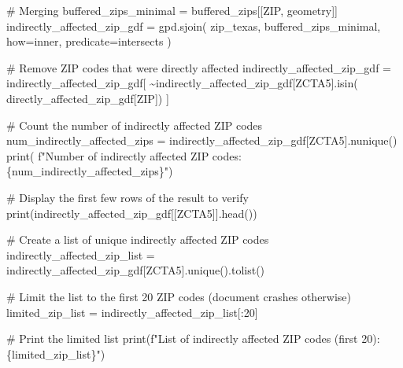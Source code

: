 \documentclass[
  letterpaper,
  DIV=11,
  numbers=noendperiod]{scrartcl}
\newenvironment{Shaded}{\begin{snugshade}}{\end{snugshade}}
\newcommand{\BuiltInTok}[1]{\textcolor[rgb]{0.00,0.23,0.31}{#1}}
\newcommand{\CommentTok}[1]{\textcolor[rgb]{0.37,0.37,0.37}{#1}}
\newcommand{\DecValTok}[1]{\textcolor[rgb]{0.68,0.00,0.00}{#1}}
\newcommand{\NormalTok}[1]{\textcolor[rgb]{0.00,0.23,0.31}{#1}}
\newcommand{\OperatorTok}[1]{\textcolor[rgb]{0.37,0.37,0.37}{#1}}
\newcommand{\SpecialCharTok}[1]{\textcolor[rgb]{0.37,0.37,0.37}{#1}}
\newcommand{\SpecialStringTok}[1]{\textcolor[rgb]{0.13,0.47,0.30}{#1}}
\newcommand{\StringTok}[1]{\textcolor[rgb]{0.13,0.47,0.30}{#1}}
\begin{document}
\begin{Shaded}
\begin{Highlighting}[]
\CommentTok{\# Merging}
\NormalTok{buffered\_zips\_minimal }\OperatorTok{=}\NormalTok{ buffered\_zips[[}\StringTok{\textquotesingle{}ZIP\textquotesingle{}}\NormalTok{, }\StringTok{\textquotesingle{}geometry\textquotesingle{}}\NormalTok{]]}
\NormalTok{indirectly\_affected\_zip\_gdf }\OperatorTok{=}\NormalTok{ gpd.sjoin(}
\NormalTok{    zip\_texas,}
\NormalTok{    buffered\_zips\_minimal,}
\NormalTok{    how}\OperatorTok{=}\StringTok{\textquotesingle{}inner\textquotesingle{}}\NormalTok{,}
\NormalTok{    predicate}\OperatorTok{=}\StringTok{\textquotesingle{}intersects\textquotesingle{}}
\NormalTok{)}

\CommentTok{\# Remove ZIP codes that were directly affected}
\NormalTok{indirectly\_affected\_zip\_gdf }\OperatorTok{=}\NormalTok{ indirectly\_affected\_zip\_gdf[}
    \OperatorTok{\textasciitilde{}}\NormalTok{indirectly\_affected\_zip\_gdf[}\StringTok{\textquotesingle{}ZCTA5\textquotesingle{}}\NormalTok{].isin(}
\NormalTok{        directly\_affected\_zip\_gdf[}\StringTok{\textquotesingle{}ZIP\textquotesingle{}}\NormalTok{])}
\NormalTok{]}

\CommentTok{\# Count the number of indirectly affected ZIP codes}
\NormalTok{num\_indirectly\_affected\_zips }\OperatorTok{=}\NormalTok{ indirectly\_affected\_zip\_gdf[}\StringTok{\textquotesingle{}ZCTA5\textquotesingle{}}\NormalTok{].nunique()}
\BuiltInTok{print}\NormalTok{(}
    \SpecialStringTok{f"Number of indirectly affected ZIP codes: }\SpecialCharTok{\{}\NormalTok{num\_indirectly\_affected\_zips}\SpecialCharTok{\}}\SpecialStringTok{"}\NormalTok{)}

\CommentTok{\# Display the first few rows of the result to verify}
\BuiltInTok{print}\NormalTok{(indirectly\_affected\_zip\_gdf[[}\StringTok{\textquotesingle{}ZCTA5\textquotesingle{}}\NormalTok{]].head())}

\CommentTok{\# Create a list of unique indirectly affected ZIP codes}
\NormalTok{indirectly\_affected\_zip\_list }\OperatorTok{=}\NormalTok{ indirectly\_affected\_zip\_gdf[}\StringTok{\textquotesingle{}ZCTA5\textquotesingle{}}\NormalTok{].unique().tolist()}

\CommentTok{\# Limit the list to the first 20 ZIP codes (document crashes otherwise)}
\NormalTok{limited\_zip\_list }\OperatorTok{=}\NormalTok{ indirectly\_affected\_zip\_list[:}\DecValTok{20}\NormalTok{]}

\CommentTok{\# Print the limited list}
\BuiltInTok{print}\NormalTok{(}\SpecialStringTok{f"List of indirectly affected ZIP codes (first 20): }\SpecialCharTok{\{}\NormalTok{limited\_zip\_list}\SpecialCharTok{\}}\SpecialStringTok{"}\NormalTok{)}
\end{Highlighting}
\end{Shaded}
\end{document}
